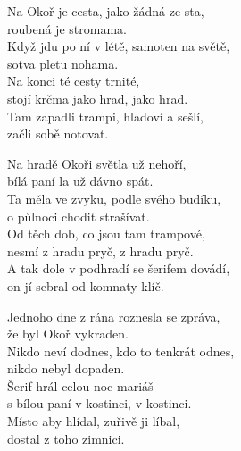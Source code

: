 \ve{}
Na Okoř je cesta, jako žádná ze sta,\\
roubená je stromama.\\
Když jdu po ní v létě, samoten na světě,\\
sotva pletu nohama.\\
Na konci té cesty trnité,\\
stojí krčma jako hrad, jako hrad.\\
Tam zapadli trampi, hladoví a sešlí,\\
začli sobě notovat.


\cho{}
Na hradě Okoři světla už nehoří,\\
bílá paní la už dávno spát.\\
Ta měla ve zvyku, podle svého budíku,\\
o půlnoci chodit strašívat.\\
Od těch dob, co jsou tam trampové,\\
nesmí z hradu pryč, z hradu pryč.\\
A tak dole v podhradí se šerifem dovádí,\\
on jí sebral od komnaty klíč.

\ve{}
Jednoho dne z rána roznesla se zpráva,\\
že byl Okoř vykraden.\\
Nikdo neví dodnes, kdo to tenkrát odnes,\\
nikdo nebyl dopaden.\\
Šerif hrál celou noc mariáš\\
s bílou paní v kostinci, v kostinci.\\
Místo aby hlídal, zuřivě ji líbal,\\
dostal z toho zimnici.\\
\cho{}
\esong